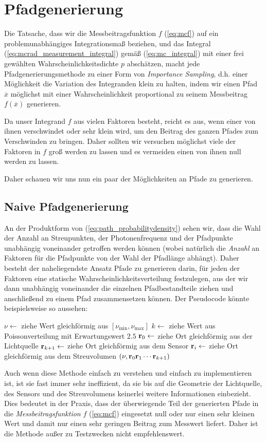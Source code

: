 	\section{Pfadgenerierung}
	Die Tatsache, dass wir die Messbeitragsfunktion $f$ (\ref{eq:mcf}) auf ein pro\-blem\-un\-ab\-hän\-gi\-ges Integrationsmaß beziehen, und das Integral (\ref{eq:mcrad_measurement_integral}) gemäß (\ref{eq:mc_integral}) mit einer frei gewählten Wahrscheinlichkeitsdichte $p$ abschätzen, macht jede Pfadgenerierungsmethode zu einer Form von {\em Importance Sampling}, d.h. einer Möglichkeit die Variation des Integranden klein zu halten, indem wir einen Pfad ${\overline x}$ möglichst mit einer Wahrscheinlichkeit proportional zu seinem Messbeitrag $f({\overline x})$ generieren.
	
	Da unser Integrand $f$ aus vielen Faktoren besteht, reicht es aus, wenn einer von ihnen verschwindet oder sehr klein wird, um den Beitrag des ganzen Pfades zum Verschwinden zu bringen. Daher sollten wir versuchen möglichst viele der Faktoren in $f$ groß werden zu lassen und es vermeiden einen von ihnen null werden zu lassen.
	
	Daher schauen wir uns nun ein paar der Möglichkeiten an Pfade zu generieren.
	\subsection{Naive Pfadgenerierung}
	An der Produktform von (\ref{eq:path_probabilitydensity}) sehen wir, dass die Wahl der Anzahl an Streupunkten, der Photonenfrequenz und der Pfadpunkte unabhängig voneinander getroffen werden können (wobei natürlich die {\em Anzahl} an Faktoren für die Pfadpunkte von der Wahl der Pfadlänge abhängt). Daher besteht der naheliegendste Ansatz Pfade zu generieren darin, für jeden der Faktoren eine statische Wahrscheinlichkeitsverteilung festzulegen, aus der wir dann unabhängig voneinander die einzelnen Pfadbestandteile ziehen und anschließend zu einem Pfad zusammensetzen können. Der Pseudocode könnte beispielsweise so aussehen:
	\begin{algorithmic}
		\STATE $\nu \leftarrow$ ziehe Wert gleichförmig aus $[\nu_\text{min},\nu_\text{max}]$
		\STATE $k \leftarrow$ ziehe Wert aus Poissonverteilung mit Erwartungswert $2.5$
		\STATE $\mathbf{r}_0 \leftarrow$ ziehe Ort gleichförmig aus der Lichtquelle
		\STATE $\mathbf{r}_{k+1} \leftarrow$ ziehe Ort gleichförmig aus dem Sensor
			\STATE $\mathbf{r}_i \leftarrow$ ziehe Ort gleichförmig aus dem Streuvolumen
	  \ENDFOR
	  \RETURN $(\nu,\mathbf{r}_0\mathbf{r}_1\cdots\mathbf{r}_{k+1})$
	\end{algorithmic}
	Auch wenn diese Methode einfach zu verstehen und einfach zu implementieren ist, ist sie fast immer sehr ineffizient, da sie bis auf die Geometrie der Lichtquelle, des Sensors und des Streuvolumens keinerlei weitere Informationen einbezieht. Dies bedeutet in der Praxis, dass der überwiegende Teil der generierten Pfade in die {\em Messbeitragsfunktion} $f$ (\ref{eq:mcf}) eingesetzt null oder nur einen sehr kleinen Wert und damit nur einen sehr geringen Beitrag zum Messwert liefert. Daher ist die Methode außer zu Testzwecken nicht empfehlenswert.
	

